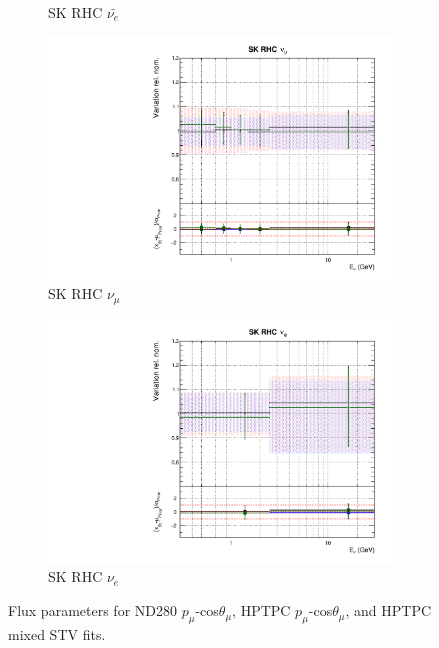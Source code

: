 \begin{figure}[t]
\begin{subfigure}{0.24\textwidth}
  \caption{SK RHC $\bar{\nu_e}$}
\end{subfigure}
\begin{subfigure}{0.24\textwidth}
  \centering
  \includegraphics[width=0.95\linewidth]{figs/hptpcfitsflux_14}
  \caption{SK RHC $\nu_{\mu}$}
\end{subfigure}
\begin{subfigure}{0.24\textwidth}
  \centering
  \includegraphics[width=0.95\linewidth]{figs/hptpcfitsflux_15}
  \caption{SK RHC $\nu_e$}
\end{subfigure}
\caption{Flux parameters for ND280 $p_{\mu}$-cos$\theta_{\mu}$, HPTPC $p_{\mu}$-cos$\theta_{\mu}$, and HPTPC mixed STV fits.}
\label{fig:hptpcflux}
\end{figure}

